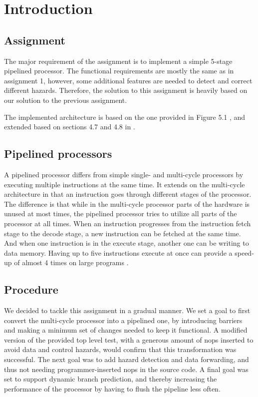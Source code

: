 \chapter{Introduction}

\section{Assignment}
The major requirement of the assignment is to implement a simple 5-stage pipelined processor.
The functional requirements are mostly the same as in assignment 1\cite[p.44]{compendium}, however, some additional features are needed to detect and correct different hazards.
Therefore, the solution to this assignment is heavily based on our solution to the previous assignment\cite{report-1}.

The implemented architecture is based on the one provided in Figure 5.1 \cite[p.50]{compendium},
and extended based on sections 4.7 and 4.8 in \cite{thebook}.

\section{Pipelined processors}

A pipelined processor differs from simple single- and multi-cycle processors by executing multiple instructions at the same time.
It extends on the multi-cycle architecture in that an instruction goes through different stages of the processor.
The difference is that while in the multi-cycle processor parts of the hardware is unused at most times, the pipelined processor tries to utilize all parts of the processor at all times.
When an instruction progresses from the instruction fetch stage to the decode stage, a new instruction can be fetched at the same time. And when one instruction is in the execute stage, another one can be writing to data memory.
Having up to five instructions execute at once can provide a speed-up of almost 4 times on large programs \cite[p.276]{thebook}.

\section{Procedure}

We decided to tackle this assignment in a gradual manner.
We set a goal to first convert the multi-cycle processor into a pipelined one, by introducing barriers and making a minimum set of changes needed to keep it functional.
A modified version of the provided top level test, with a generous amount of nops inserted to avoid data and control hazards, would confirm that this transformation was successful.
The next goal was to add hazard detection and data forwarding, and thus not needing programmer-inserted nops in the source code.
A final goal was set to support dynamic branch prediction, and thereby increasing the performance of the processor by having to flush the pipeline less often.
